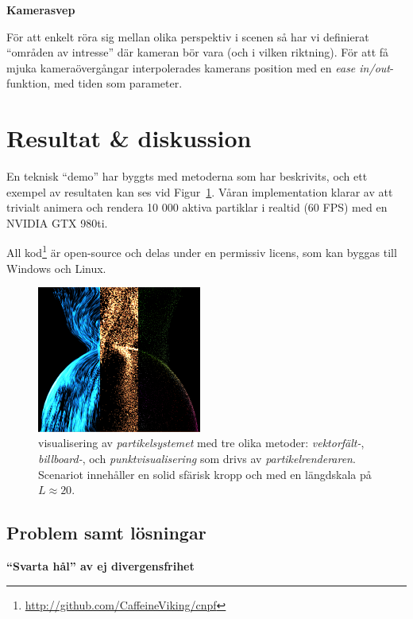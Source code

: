 \documentclass[a4paper]{article}
\begin{document}
\begin{multicols}{2}
\textbf{Kamerasvep}

För att enkelt röra sig mellan olika perspektiv i scenen så har vi definierat ``områden av intresse'' där kameran bör vara (och i vilken riktning).  För att få mjuka kameraövergångar interpolerades kamerans position med en \emph{ease in/out}-funktion, med tiden som parameter.

\section{Resultat \& diskussion} \label{sec:results}

En teknisk ``demo'' har byggts med metoderna som har beskrivits, och ett exempel av resultaten kan ses vid Figur~\ref{fig:verysexy}. Våran implementation klarar av att trivialt animera och rendera 10 000 aktiva partiklar i realtid (60 FPS) med en NVIDIA GTX 980ti.

All kod\footnote{\url{http://github.com/CaffeineViking/cnpf}} är open-source och delas under en permissiv licens, som kan byggas till Windows och Linux.

\begin{figure}[H]
\center
\includegraphics[width=0.48\textwidth]{share/merged_shaders.png}
    \caption{visualisering av \emph{partikelsystemet} med tre olika metoder: \emph{vektorfält-}, \emph{billboard-}, och \emph{punktvisualisering} som drivs av \emph{partikelrenderaren}. Scenariot innehåller en solid sfärisk kropp och med en längdskala på \(L\approx20\).}
\label{fig:verysexy}
\end{figure}

\vspace{-0.8cm}
        \subsection{Problem samt lösningar}

            \textbf{``Svarta hål'' av ej divergensfrihet}


\end{multicols}
\end{document}
